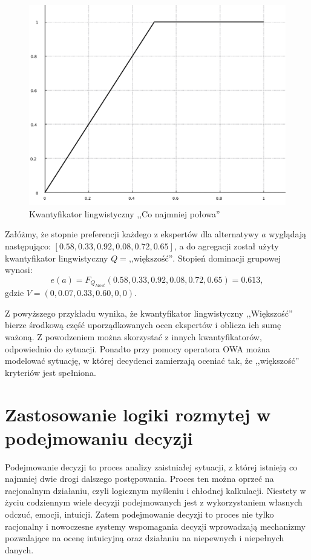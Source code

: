 \begin{figure}[ht]
  \includegraphics[width=\linewidth]
  	{chapters/fuzzylogic/fuzzy_half}
  \caption{Kwantyfikator lingwistyczny ,,Co najmniej połowa''}
  \label{fig:kwantyfikator_lingwistyczny_polowa}
\end{figure}

\begin{example}
Załóżmy, że stopnie preferencji każdego z ekspertów dla alternatywy $a$
wyglądają następująco: $[0.58, 0.33, 0.92, 0.08, 0.72, 0.65]$, a do agregacji
został użyty kwantyfikator lingwistyczny $Q = \textrm{,,większość''}$. Stopień
dominacji grupowej wynosi:
$$e(a) = F_{Q_{Most}}(0.58, 0.33, 0.92, 0.08, 0.72, 0.65) = 0.613,$$
gdzie $V=(0, 0.07, 0.33, 0.60, 0, 0).$
\end{example}

Z powyższego przykładu wynika, że kwantyfikator lingwistyczny ,,Większość''
bierze środkową część uporządkowanych ocen ekspertów i oblicza ich sumę ważoną.
Z powodzeniem można skorzystać z innych kwantyfikatorów, odpowiednio do
sytuacji. Ponadto przy pomocy operatora OWA można modelować sytuację, w której
decydenci zamierzają oceniać tak, że ,,większość'' kryteriów jest spełniona.

\section{Zastosowanie logiki rozmytej w podejmowaniu decyzji}
Podejmowanie decyzji to proces analizy zaistniałej sytuacji, z której istnieją 
co najmniej dwie drogi dalszego postępowania. Proces ten można oprzeć na 
racjonalnym działaniu, czyli logicznym myśleniu i chłodnej kalkulacji. Niestety 
w życiu codziennym wiele decyzji podejmowanych jest z wykorzystaniem własnych 
odczuć, emocji, intuicji. Zatem podejmowanie decyzji to proces nie tylko 
racjonalny i nowoczesne systemy wspomagania decyzji wprowadzają mechanizmy 
pozwalające na ocenę intuicyjną oraz działaniu na niepewnych i niepełnych 
danych.

